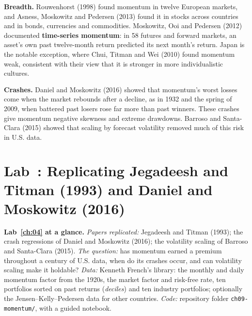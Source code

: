 \textbf{Breadth.} Rouwenhorst (1998) found momentum in twelve European markets, and Asness, Moskowitz and Pedersen (2013) found it in stocks across countries and in bonds, currencies and commodities. Moskowitz, Ooi and Pedersen (2012) documented \textbf{time-series momentum}: in 58 futures and forward markets, an asset's own past twelve-month return predicted its next month's return. Japan is the notable exception, where Chui, Titman and Wei (2010) found momentum weak, consistent with their view that it is stronger in more individualistic cultures.

\textbf{Crashes.} Daniel and Moskowitz (2016) showed that momentum's worst losses come when the market rebounds after a decline, as in 1932 and the spring of 2009, when battered past losers rose far more than past winners. These crashes give momentum negative skewness and extreme drawdowns. Barroso and Santa-Clara (2015) showed that scaling by forecast volatility removed much of this risk in U.S. data.

\section{Lab~\thechapter: Replicating Jegadeesh and Titman (1993) and Daniel and Moskowitz (2016)}
\label{sec:05-lab}

\begin{callout}
\textbf{Lab~\ref{ch:04} at a glance.} \emph{Papers replicated:} Jegadeesh and Titman (1993); the crash regressions of Daniel and Moskowitz (2016); the volatility scaling of Barroso and Santa-Clara (2015). \emph{The question:} has momentum earned a premium throughout a century of U.S. data, when do its crashes occur, and can volatility scaling make it holdable? \emph{Data:} Kenneth French's library: the monthly and daily momentum factor from the 1920s, the market factor and risk-free rate, ten portfolios sorted on past returns (\emph{deciles}) and ten industry portfolios; optionally the Jensen--Kelly--Pedersen data for other countries. \emph{Code:} repository folder \texttt{ch09-momentum/}, with a guided notebook.
\end{callout}


